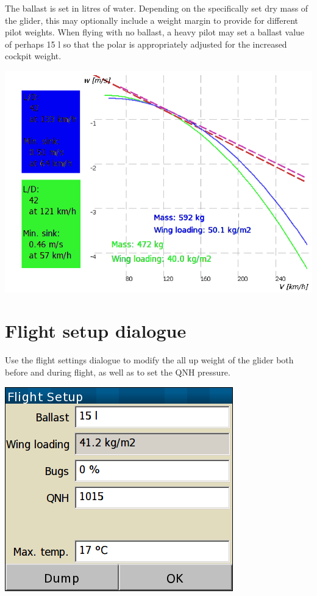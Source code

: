The ballast is set in litres of water. 
Depending on the specifically set dry mass of the glider, this may optionally 
include a weight margin to provide for different pilot weights.
  When flying with no ballast, a heavy pilot
may set a ballast value of perhaps 15 l so that the polar is
appropriately adjusted for the increased cockpit weight.

\begin{center}
\includegraphics[angle=0,width=\linewidth,keepaspectratio='true']{figures/overlay-non-balasted-polar.png}
\end{center}


\section{Flight setup dialogue}\label{sec:flight-setup}
Use the flight settings dialogue to modify the all up weight of the glider both
before and during flight, as well as to set the QNH pressure.  

\begin{center}
\includegraphics[angle=0,width=0.45\linewidth,keepaspectratio='true']{figures/dialog-basicsettings.png}
\end{center}

